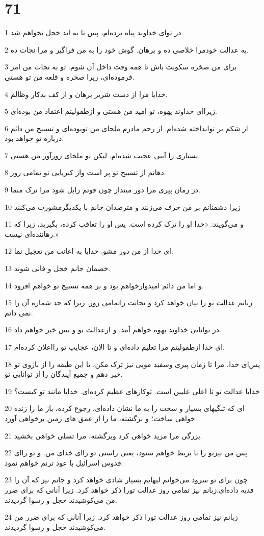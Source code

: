 \chapter{71}

\par 1 در تو‌ای خداوند پناه برده‌ام، پس تا به ابد خجل نخواهم شد.
\par 2 به عدالت خودمرا خلاصی ده و برهان. گوش خود را به من فراگیر و مرا نجات ده.
\par 3 برای من صخره سکونت باش تا همه وقت داخل آن شوم. تو به نجات من امر فرموده‌ای، زیرا صخره و قلعه من تو هستی.
\par 4 خدایا مرا از دست شریر برهان و از کف بدکار وظالم.
\par 5 زیرا‌ای خداوند یهوه، تو امید من هستی و ازطفولیتم اعتماد من بوده‌ای.
\par 6 از شکم بر توانداخته شده‌ام. از رحم مادرم ملجای من توبوده‌ای و تسبیح من دائم درباره تو خواهد بود.
\par 7 بسیاری را آیتی عجیب شده‌ام. لیکن تو ملجای زورآور من هستی.
\par 8 دهانم از تسبیح تو پر است واز کبریایی تو تمامی روز.
\par 9 در زمان پیری مرا دور مینداز چون قوتم زایل شود مرا ترک منما.
\par 10 زیرا دشمنانم بر من حرف می‌زنند و مترصدان جانم با یکدیگرمشورت می‌کنند
\par 11 و می‌گویند: «خدا او را ترک کرده است. پس او را تعاقب کرده، بگیرید، زیرا که رهاننده‌ای نیست.»
\par 12 ‌ای خدا از من دور مشو. خدایا به اعانت من تعجیل نما.
\par 13 خصمان جانم خجل و فانی شوند.
\par 14 و اما من دائم امیدوارخواهم بود و بر همه تسبیح تو خواهم افزود.
\par 15 زبانم عدالت تو را بیان خواهد کرد و نجاتت راتمامی روز. زیرا که حد شماره آن را نمی دانم.
\par 16 در توانایی خداوند یهوه خواهم آمد. و ازعدالت تو و بس خبر خواهم داد.
\par 17 ‌ای خدا ازطفولیتم مرا تعلیم داده‌ای و تا الان، عجایب تو رااعلان کرده‌ام.
\par 18 پس‌ای خدا، مرا تا زمان پیری وسفید مویی نیز ترک مکن، تا این طبقه را از بازوی تو خبر دهم و جمیع آیندگان را از توانایی تو.
\par 19 خدایا عدالت تو تا اعلی علیین است. توکارهای عظیم کرده‌ای. خدایا مانند تو کیست؟
\par 20 ‌ای که تنگیهای بسیار و سخت را به ما نشان داده‌ای، رجوع کرده، باز ما را زنده خواهی ساخت؛ و برگشته، ما را از عمق های زمین برخواهی آورد.
\par 21 بزرگی مرا مزید خواهی کرد وبرگشته، مرا تسلی خواهی بخشید.
\par 22 پس من نیزتو را با بربط خواهم ستود، یعنی راستی تو را‌ای خدای من. و تو را‌ای قدوس اسرائیل با عود ترنم خواهم نمود.
\par 23 چون برای تو سرود می‌خوانم لبهایم بسیار شادی خواهد کرد و جانم نیز که آن را فدیه داده‌ای.زبانم نیز تمامی روز عدالت تورا ذکر خواهد کرد. زیرا آنانی که برای ضرر من می‌کوشیدند خجل و رسوا گردیدند.
\par 24 زبانم نیز تمامی روز عدالت تورا ذکر خواهد کرد. زیرا آنانی که برای ضرر من می‌کوشیدند خجل و رسوا گردیدند.
 
